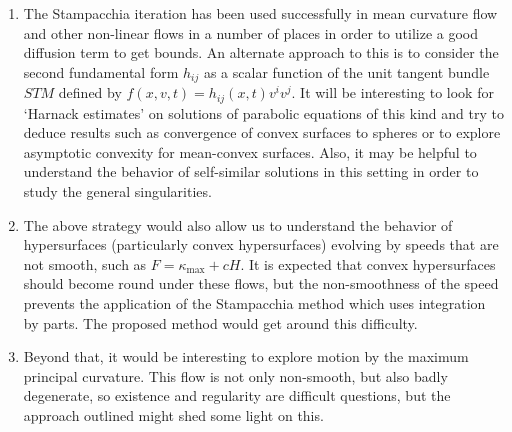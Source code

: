 \documentclass[11pt]{article}
\begin{document}
\begin{enumerate}
    \item The Stampacchia iteration has been used successfully in mean curvature flow and other non-linear flows in a number of places in order to utilize a good diffusion term to get bounds. An alternate approach to this is to consider the second fundamental form $ h_{ij} $ as a scalar function of the unit tangent bundle $ STM $ defined by $ f(x,v,t) = h_{ij}(x,t)v^{i}v^{j} $. %
    It will be interesting to look for `Harnack estimates' on solutions of parabolic equations of this kind and try to deduce results such as convergence of convex surfaces to spheres or to explore asymptotic convexity for mean-convex surfaces. %
    Also, it may be helpful to understand the behavior of self-similar solutions in this setting in order to study the general singularities.  
    \item The above strategy would also allow us to understand the behavior of hypersurfaces (particularly convex hypersurfaces) evolving by speeds that are not smooth, such as $F=\kappa_{\max}+cH$.  It is expected that convex hypersurfaces should become round under these flows, but the non-smoothness of the speed prevents the application of the Stampacchia method which uses integration by parts.  The proposed method would get around this difficulty.
    \item Beyond that, it would be interesting to explore motion by the maximum principal curvature.  This flow is not only non-smooth, but also badly degenerate, so existence and regularity are difficult questions, but the approach outlined might shed some light on this.
\end{enumerate}



\nocite{*}
\end{document}
